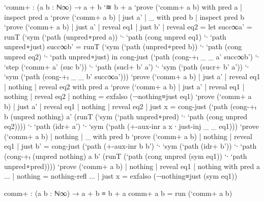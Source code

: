 \begin{code}[hide]
`comm+ : (a b : ℕ∞) → a + b `≋ b + a
`prove (`comm+ a b) with pred a | inspect pred a
`prove (`comm+ a b) | just a' | _ with pred b | inspect pred b
`prove (`comm+ a b) | just a' | reveal eq1 | just b' | reveal eq2 =
  let succ∞a' = runT (`sym (`path (unpred∘pred {a})) `∙ `path (cong unpred eq1) `∙ `path unpred∘just)
      succ∞b' = runT (`sym (`path (unpred∘pred {b})) `∙ `path (cong unpred eq2) `∙ `path unpred∘just)
  in cong-just (`path (cong-+ₗ _ _ a' succ∞b')
 `∙ `step (`comm+ a' (suc b'))
 `∙ `path (sucl+ b' a')
 `∙ `sym (`path (sucr+ b' a'))
 `∙ `sym (`path (cong-+ₗ _ _ b' succ∞a')))
`prove (`comm+ a b) | just a' | reveal eq1 | nothing | reveal eq2 with pred a
`prove (`comm+ a b) | just a' | reveal eq1 | nothing | reveal eq2 | nothing = exfalso (¬nothing≡just eq1)
`prove (`comm+ a b) | just a' | reveal eq1 | nothing | reveal eq2 | just x = cong-just
  (`path (cong-+ₗ b (unpred nothing) a' (runT (`sym (`path unpred∘pred) `∙ `path (cong unpred eq2))))
  `∙ `path (idr+ a')
  `∙ `sym (`path (+-aux-inr a x ∙ just-inj _ _ eq1)))
`prove (`comm+ a b) | nothing | _ with pred b
`prove (`comm+ a b) | nothing | reveal eq1 | just b' = cong-just (`path (+-aux-inr b b')
                                               `∙ `sym (`path (idr+ b'))
                                               `∙ `path (cong-+ₗ (unpred nothing) a b' (runT (`path (cong unpred (sym eq1)) `∙ `path unpred∘pred))))
`prove (`comm+ a b) | nothing | reveal eq1 | nothing with pred a
... | nothing = nothing-refl
... | just x = exfalso (¬nothing≡just (sym eq1))

comm+ : (a b : ℕ∞) → a + b ≡ b + a
comm+ a b = run (`comm+ a b)
\end{code}
